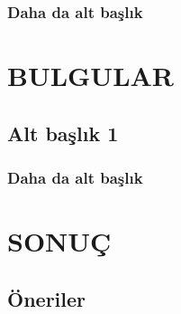 \documentclass[11pt]{article}
\begin{document}
\lipsum[6-7]

\subsubsection{Daha da alt başlık }

\lipsum[8-9]

\clearpage

\section{BULGULAR}

\noindent

\lipsum[9-10]

\subsection{Alt başlık 1}


\lipsum[11-12]

\subsubsection{Daha da alt başlık }


\lipsum[13-14]


\clearpage

\section{SONUÇ}


\lipsum[15-16]



\subsection{Öneriler}


\lipsum[17-18]



\sectionfont{\raggedright}
{\small 



}




\label{endsectionb1}
\end{document}
